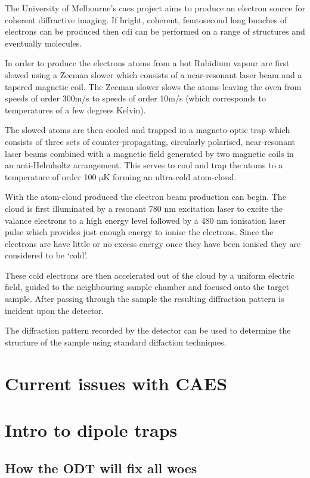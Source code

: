 The University of Melbourne's \gls{caes} project aims to produce an electron source for coherent diffractive imaging. If bright, coherent, femtosecond long bunches of electrons can be produced then \gls{cdi} can be performed on a range of structures and eventually molecules.

In order to produce the electrons atoms from a hot Rubidium vapour are first slowed using a Zeeman slower\cite{phillips_cooling_1987} which consists of a near-resonant laser beam and a tapered magnetic coil. The Zeeman slower slows the atoms leaving the oven from speeds of order 300m/s to speeds of order 10m/s (which corresponds to temperatures of a few degrees Kelvin).


The slowed atoms are then cooled and trapped in a magneto-optic trap which consists of three sets of counter-propagating, circularly polarised, near-resonant laser beams combined with a magnetic field generated by two magnetic coils in an anti-Helmholtz arrangement. This serves to cool and trap the atoms to a temperature of order 100 $\mathrm{\mu}$K forming an ultra-cold atom-cloud.

With the atom-cloud produced the electron beam production can begin. The cloud is first illuminated by a resonant 780 nm excitation laser to excite the valance electrons to a high energy level followed by a 480 nm ionisation laser pulse which provides just enough energy to ionise the electrons. Since the electrons are have little or no excess energy once they have been ionised they are considered to be `cold'.

These cold electrons are then accelerated out of the cloud by a uniform electric field, guided to the neighbouring sample chamber and focused onto the target sample. After passing through the sample the resulting diffraction pattern is incident upon the detector.

The diffraction pattern recorded by the detector can be used to determine the structure of the sample using standard diffaction techniques.

\section{Current issues with CAES}

\section{Intro to dipole traps}

    \subsection{How the ODT will fix all woes}


